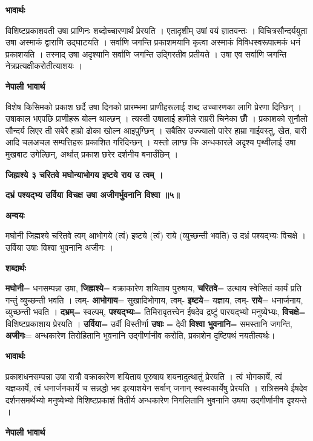 \documentclass[11pt, a5paper]{article}
\begin{document}
\textbf{भावार्थः}

विशिष्टप्रकाशवती उषा प्राणिनः शब्दोच्चारणार्थं प्रेरयति । एतादृशीम् उषां वयं ज्ञातवन्तः । विचित्रसौन्दर्ययुता उषा अस्माकं द्वाराणि उद्‌घाटयति । सर्वाणि जगन्ति प्रकाशमयानि कृत्वा अस्माकं विविधस्वरूपात्मकं धनं प्रकाशयति । तस्माद् उषा अदृश्यानि सर्वाणि जगन्ति उद्गिरतीव प्रतीयते । उषा एव सर्वाणि जगन्ति नेत्रप्रत्यक्षीकरोतीत्याशयः ।

\textbf{नेपाली भावार्थ}

विशेष किसिमको प्रकाश छर्दै उषा दिनको प्रारम्भमा प्राणीहरूलाई शब्द उच्चारणका लागि प्रेरणा दिन्छिन् । उषाकाल भएपछि प्राणीहरू बोल्न थाल्छन् । त्यस्ती उषालाई हामीले राम्ररी चिनेका छौँ । प्रकाशको सुनौलो सौन्दर्य लिएर ती सबेरै हाम्रो ढोका खोल्न आइपुग्छिन् । सबैतिर उज्ज्यालो पारेर हाम्रा गाईवस्तु, खेत, बारी आदि चलअचल सम्पत्तिहरू प्रकाशित गरिदिन्छन् । यस्तो लाग्छ कि अन्धकारले अदृश्य पृथ्वीलाई उषा मुखबाट उगेल्छिन्, अर्थात् प्रकाश छरेर दर्शनीय बनाउँछिन् ।

\textbf{जिह्मश्ये ३ चरितवे मघोन्याभोगय इष्टये राय उ त्वम् ।}

\textbf{दभ्रं पश्यद्भ्य उर्विया विचक्ष उषा अजीगर्भुवनानि विश्वा ॥५॥}

\textbf{अन्वयः}

मघोनी जिह्मश्ये चरितवे त्वम् आभोगये (त्वं) इष्टये (त्वं) राये (व्युच्छन्ती भवति) उ दभ्रं पश्यद्भ्यः विचक्षे । उर्विया उषाः विश्वा भुवनानि अजीगः ।

\textbf{शब्दार्थः}

\textbf{मघोनी}= धनसम्पन्ना उषा, \textbf{जिह्मश्ये}= वक्राकारेण शयिताय पुरुषाय, \textbf{चरितवे}= उत्थाय स्वेप्सितं कार्यं प्रति गन्तुं व्युच्छन्ती भवति । त्वम्- \textbf{आभोगाय}= सुखादिभोगाय, त्वम्- \textbf{इष्टये}= यज्ञाय, त्वम्- \textbf{राये}= धनार्जनाय, व्युच्छन्ती भवति । \textbf{दभ्रम्}= स्वल्पम्, \textbf{पश्यद्भ्यः}= तिमिरावृतत्त्वेन ईषदेव द्रष्टुं पारयद्भ्यो मनुष्येभ्यः, \textbf{विचक्षे}= विशिष्टप्रकाशाय प्रेरयति । \textbf{उर्विया}= उर्वी विस्तीर्णा \textbf{उषाः} = देवी \textbf{विश्वा भुवनानि}= समस्तानि जगन्ति, \textbf{अजीगः}= अन्धकारेण तिरोहितानि भुवनानि उद्गीर्णानीव करोति, प्रकाशेन दृष्टिपथं नयतीत्यर्थः।

\textbf{भावार्थः}

प्रकाशधनसम्पन्ना उषा रात्रौ वक्राकारेण शयिताय पुरुषाय शयनादुत्थातुं प्रेरयति । त्वं भोगकार्ये, त्वं यज्ञकार्ये, त्वं धनार्जनकार्ये च सन्नद्धो भव इत्याशयेन सर्वान् जनान् स्वस्वकार्येषु प्रेरयति । रात्रिसमये ईषदेव दर्शनसमर्थेभ्यो मनुष्येभ्यो विशिष्टप्रकाशं वितीर्य अन्धकारेण निगलितानि भुवनानि उषया उद्गीर्णानीव दृश्यन्ते ।

\textbf{नेपाली भावार्थ}
\end{document}
